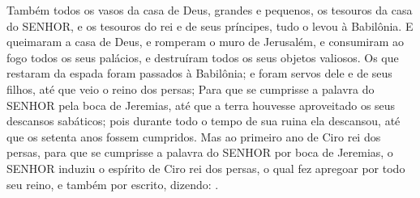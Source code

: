 {  Também todos os vasos da casa de Deus, grandes e pequenos, os tesouros da casa do SENHOR, e os tesouros do rei e de seus príncipes, tudo o levou à Babilônia.
  E queimaram a casa de Deus, e romperam o muro de Jerusalém, e consumiram ao fogo todos os seus palácios, e destruíram todos os seus objetos valiosos.
  Os que restaram da espada foram passados à Babilônia; e foram servos dele e de seus filhos, até que veio o reino dos persas;
  Para que se cumprisse a palavra do SENHOR pela boca de Jeremias, até que a terra houvesse aproveitado os seus descansos sabáticos; pois durante todo o tempo de sua ruina ela descansou, até que os setenta anos fossem cumpridos.
  Mas ao primeiro ano de Ciro rei dos persas, para que se cumprisse a palavra do SENHOR por boca de Jeremias, o SENHOR induziu o espírito de Ciro rei dos persas, o qual fez apregoar por todo seu reino, e também por escrito, dizendo:
  .\par }

